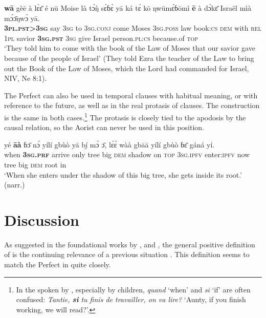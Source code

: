 \documentclass[output=paper,newtxmath,modfonts,nonflat,hidelinks]{langsci/langscibook}
\begin{document}
\begin{exe} \ex
\gll \textbf{wā}	gèē	à	lɛ̀ɛ̄	é	nū	Moise	là	tɔ́ŋ̀	sɛ̀ɓɛ̀ yā	ká	tɛ́	kō	ŋwūmɛ́ɓōmì	\textbf{ē}	à	dɔ̀kɛ̄	Israël	mìà mɔ́ɔ̄ŋwɔ̀	yā. \\
	\textbf{3\textsc{pl}.\textsc{pst}>3\textsc{sg}}	say	3\textsc{sg}	to	3\textsc{sg}.\textsc{conj}	come	Moses	3\textsc{sg}.\textsc{poss}	law	book:\textsc{cs} \textsc{dem}	with	\textsc{rel}	1\textsc{pl}	savior	\textbf{3\textsc{sg}.\textsc{pst}}	3\textsc{sg}	give	Israel	person.\textsc{pl}:\textsc{cs} because.of	\textsc{top} \\
\glt ‘They told him to come with the book of the Law of Moses that our savior gave because of the people of Israel’ (They told Ezra the teacher of the Law to bring out the Book of the Law of Moses, which the Lord had commanded for Israel, NIV, Ne 8:1).
\end{exe}

The Perfect can also be used in temporal clauses with habitual meaning, or with reference to the future, as well as in the real protasis of  clauses. The construction is the same in both cases.\footnote{In the  spoken by , especially by children, \textit{quand} ‘when’ and \textit{si} ‘if’ are often confused: \textit{Tantie, \textbf{si} tu finis de travailler, on va lire?}  ‘Aunty, if you finish working, we will read?’.} The protasis is closely tied to the apodosis by the causal relation, so the Aorist can never be used in this position.  

\begin{exe} \ex
\gll yé	\textbf{āà}	ɓɔ̄	nɔ́	yílí	gbùò	yā	bḭ́	mɔ̀	ɔ̄, lɛ́ɛ̀	wàà	gbāā	yílí	gbùò	ɓɛ̄	gáná	yí. \\
	when	\textbf{3\textsc{sg}.\textsc{prf}}	arrive	only	tree	big	\textsc{dem}	shadow	on	\textsc{top} 3\textsc{sg}.\textsc{ipfv}	enter:\textsc{ipfv}	now	tree	big	\textsc{dem}	root	in\\
\glt ‘When she enters under the shadow of this big tree, she gets inside its root.’ (narr.)
\end{exe}

\section{Discussion}
\label{khachs6}

As suggested in the foundational works by \citet{khachcomrie1976}, \citet{khachmccoard1978} and \citet{khachdahl1985}, the general positive definition of  is the continuing relevance of a previous situation \citep[56]{khachcomrie1976}. This definition seems to match the Perfect in  quite closely.
\end{document}
